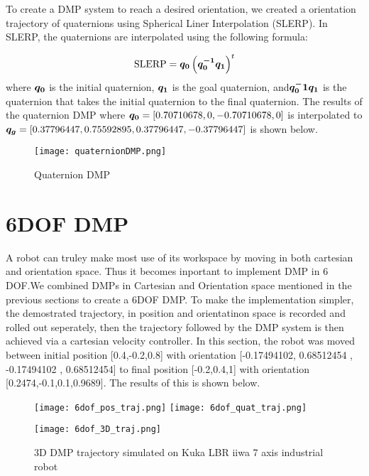 To create a DMP system to reach a desired orientation, we created a orientation trajectory of quaternions using Spherical Liner Interpolation
(SLERP). In SLERP, the quaternions are interpolated using the following formula:

\begin{equation}
    \text{SLERP} = \boldsymbol{q_0} \left( \boldsymbol{q_0^{-1} q_1} \right)^t
\end{equation}
where $\boldsymbol{q_0}$ is the initial quaternion, $\boldsymbol{q_1}$ is the goal quaternion, and$\boldsymbol{q_0^-1 q_1}$ is 
the quaternion that takes the initial quaternion to the final quaternion. The results of the quaternion DMP where 
$\boldsymbol{q_0} =[0.70710678,0,-0.70710678,0] $  is interpolated to 
$\boldsymbol{q_g} = [0.37796447 , 0.75592895  ,0.37796447, -0.37796447]$ is shown below.

\begin{figure}[h]
\centering
\texttt{[image: quaternionDMP.png]}
\caption{Quaternion DMP}
\label{fig:quaternionDMP}
\end{figure}




\section{6DOF DMP}
A robot can truley make most use of its workspace by moving in both cartesian and orientation space. 
Thus it becomes inportant to implement DMP in 6 DOF.We combined DMPs in Cartesian and Orientation space mentioned in the previous sections to create a 6DOF DMP.
To make the implementation simpler, the demostrated trajectory, in position and orientatinon space is recorded and rolled out seperately,
then the trajectory followed by the DMP system is then achieved via a cartesian velocity controller. In this section, the robot was moved between initial position [0.4,-0.2,0.8] with 
orientation [-0.17494102, 0.68512454 , -0.17494102 , 0.68512454] 
to final position [-0.2,0.4,1] with orientation [0.2474,-0.1,0.1,0.9689]. The results of this is shown below.

\begin{figure}[h]
    \centering
    \texttt{[image: 6dof\_pos\_traj.png]}\quad
    \texttt{[image: 6dof\_quat\_traj.png]}

    \medskip

    \texttt{[image: 6dof\_3D\_traj.png]}

    \caption{3D DMP trajectory simulated on Kuka LBR iiwa 7 axis industrial robot}
    \label{fig:3D_only_taj_pybullet}
\end{figure}


